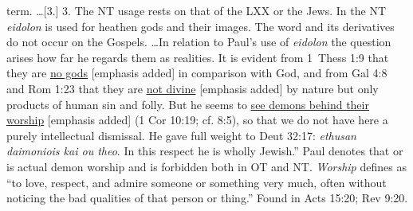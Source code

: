 term. \ldots [3.] 3. The NT usage rests on that of the LXX or the Jews. In the NT \emph{eidolon} is used for heathen gods and their images. The word and its derivatives do not occur on the Gospels. \ldots In relation to Paul's use of \emph{eidolon} the question arises how far he regards them as realities. It is evident from 1~Thess 1:9 that they are \underline{no gods} [emphasis added] in comparison with God, and from Gal 4:8 and Rom 1:23 that they are \underline{not divine} [emphasis added] by nature but only products of human sin and folly. But he seems to \underline{see demons behind their worship} [emphasis added] (1 Cor 10:19; cf. 8:5), so that we do not have here a purely intellectual dismissal. He gave full weight to Deut 32:17: \emph{ethusan daimoniois kai ou theo}. In this respect he is wholly Jewish.'' Paul denotes that  or  is actual demon worship and is forbidden both in OT and NT. \emph{Worship} defines as ``to love, respect, and admire someone or something very much, often without noticing the bad qualities of that person or thing.''
Found in Acts 15:20; Rev 9:20.
